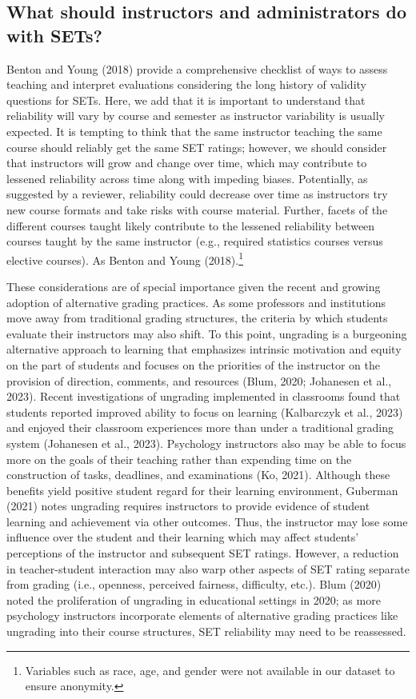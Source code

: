 \documentclass[
  man,mask]{apa7}
\begin{document}
\subsection{What should instructors and administrators do with SETs?}\label{what-should-instructors-and-administrators-do-with-sets}

Benton and Young (2018) provide a comprehensive checklist of ways to assess teaching and interpret evaluations considering the long history of validity questions for SETs. Here, we add that it is important to understand that reliability will vary by course and semester as instructor variability is usually expected. It is tempting to think that the same instructor teaching the same course should reliably get the same SET ratings; however, we should consider that instructors will grow and change over time, which may contribute to lessened reliability across time along with impeding biases. Potentially, as suggested by a reviewer, reliability could decrease over time as instructors try new course formats and take risks with course material. Further, facets of the different courses taught likely contribute to the lessened reliability between courses taught by the same instructor (e.g., required statistics courses versus elective courses). As Benton and Young (2018).\footnote{Variables such as race, age, and gender were not available in our
  dataset to ensure anonymity.}

These considerations are of special importance given the recent and
growing adoption of alternative grading practices. As some professors
and institutions move away from traditional grading structures, the
criteria by which students evaluate their instructors may
also shift. To this point, ungrading is a burgeoning alternative
approach to learning that emphasizes intrinsic motivation and equity on
the part of students and focuses on the priorities of the instructor on
the provision of direction, comments, and resources (Blum, 2020; Johanesen et al., 2023). Recent investigations of ungrading implemented in
classrooms found that students reported improved ability to focus on
learning (Kalbarczyk et al., 2023) and enjoyed their classroom experiences more
than under a traditional grading system (Johanesen et al., 2023). Psychology
instructors also may be able to focus more on the goals of their
teaching rather than expending time on the construction of tasks,
deadlines, and examinations (Ko, 2021). Although these benefits yield
positive student regard for their learning environment, Guberman (2021)
notes ungrading requires instructors to provide evidence of student
learning and achievement via other outcomes. Thus, the instructor may
lose some influence over the student and their learning which may affect
students' perceptions of the instructor and subsequent SET ratings.
However, a reduction in teacher-student interaction may also warp other
aspects of SET rating separate from grading (i.e., openness, perceived
fairness, difficulty, etc.). Blum (2020) noted the proliferation of
ungrading in educational settings in 2020; as more psychology
instructors incorporate elements of alternative grading practices like
ungrading into their course structures, SET reliability may need to be
reassessed.
\end{document}
